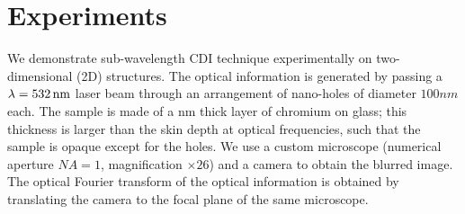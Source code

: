 \section{Experiments}
\label{sec:sparse-experiments}
We demonstrate sub-wavelength CDI technique experimentally on
two-dimensional (2D) structures. The optical information is generated
by passing a $\lambda=\unit[532]{nm}$ laser beam through an arrangement of
nano-holes of diameter $100nm$ each. The sample is made of a
\unit[100]{nm} thick
layer of chromium on glass; this thickness is larger than the skin
depth at optical frequencies, such that the sample is opaque except
for the holes. We use a custom microscope (numerical aperture $NA=1$,
magnification $\times 26$)
and a camera to obtain the blurred image. The optical Fourier
transform of the optical information is obtained by translating the
camera to the focal plane of the same microscope.


